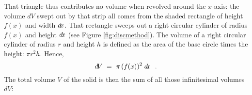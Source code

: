 \piccaption[]{\label{fig:discmethod}}
That triangle thus contributes no volume when revolved around the
$x$-axis: the volume $d\!V$ swept out by that strip all comes from the shaded
rectangle of height $f(x)$ and width $d\!x$. That rectangle sweeps out a right
circular cylinder of radius $f(x)$ and height $d\!x$ (see Figure
\ref{fig:discmethod}). The volume of a right circular cylinder of radius $r$ and
height $h$ is defined as the area of the base circle times the height:
$\pi r^2h$. Hence,
\[
d\!V ~=~ \pi\,(f(x))^2\;d\!x ~~.
\]
The total volume $V$ of the solid is then the sum of all those infinitesimal
volumes $d\!V$:

